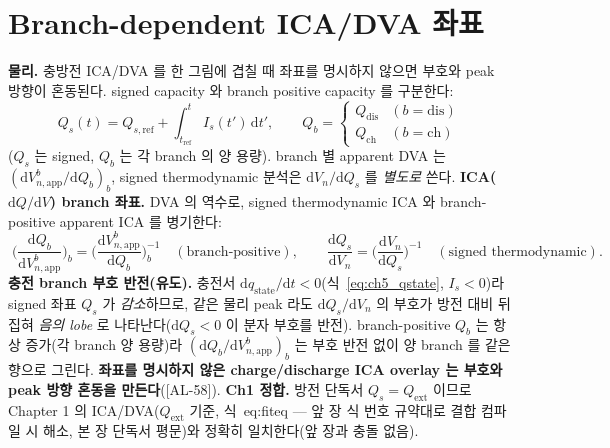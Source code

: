 \documentclass[11pt,a4paper]{article}
\newcommand{\dd}{\mathrm{d}}
\newcommand{\app}{\mathrm{app}}
\newcommand{\ext}{\mathrm{ext}}
\newcommand{\dis}{\mathrm{dis}}
\newcommand{\chg}{\mathrm{ch}}
\newcommand{\stt}{\mathrm{state}}
\newcommand{\AL}[1]{\textsf{[AL-#1]}}
\begin{document}
\section{Branch-dependent ICA/DVA 좌표}\label{sec:ch5_icadva}
\textbf{물리.} 충방전 ICA/DVA 를 한 그림에 겹칠 때 좌표를 명시하지 않으면 부호와 peak 방향이 혼동된다. signed
capacity 와 branch positive capacity 를 구분한다:
\begin{equation}
Q_s(t)=Q_{s,\mathrm{ref}}+\int_{t_{\mathrm{ref}}}^t I_s(t')\,\dd t',\qquad
Q_b=\begin{cases}Q_\dis & (b=\dis)\\ Q_\chg & (b=\chg)\end{cases}
\label{eq:ch5_signed_cap}
\end{equation}
($Q_s$ 는 signed, $Q_b$ 는 각 branch 의 양 용량). branch 별 apparent DVA 는 $(\dd V_{n,\app}^b/\dd Q_b)_b$,
signed thermodynamic 분석은 $\dd V_n/\dd Q_s$ 를 \emph{별도로} 쓴다. \textbf{ICA($\dd Q/\dd V$) branch 좌표.}
DVA 의 역수로, signed thermodynamic ICA 와 branch-positive apparent ICA 를 병기한다:
\begin{equation}
\boxed{\;\Big(\frac{\dd Q_b}{\dd V_{n,\app}^b}\Big)_b=\Big(\frac{\dd V_{n,\app}^b}{\dd Q_b}\Big)_b^{-1}
\quad(\text{branch-positive}),\qquad
\frac{\dd Q_s}{\dd V_n}=\Big(\frac{\dd V_n}{\dd Q_s}\Big)^{-1}\quad(\text{signed thermodynamic}).\;}
\label{eq:ch5_branch_ica}
\end{equation}
\textbf{충전 branch 부호 반전(유도).} 충전서 $\dd q_\stt/\dd t<0$(식~\eqref{eq:ch5_qstate}, $I_s<0$)라 signed
좌표 $Q_s$ 가 \emph{감소}하므로, 같은 물리 peak 라도 $\dd Q_s/\dd V_n$ 의 부호가 방전 대비 뒤집혀 \emph{음의
lobe} 로 나타난다($\dd Q_s<0$ 이 분자 부호를 반전). branch-positive $Q_b$ 는 항상 증가(각 branch 양 용량)라
$(\dd Q_b/\dd V_{n,\app}^b)_b$ 는 부호 반전 없이 양 branch 를 같은 향으로 그린다. \textbf{좌표를 명시하지 않은
charge/discharge ICA overlay 는 부호와 peak 방향 혼동을 만든다}(\AL{58}). \textbf{Ch1 정합.} 방전 단독서
$Q_s=Q_\ext$ 이므로 Chapter 1 의 ICA/DVA($Q_\ext$ 기준, 식~eq:fiteq — 앞 장 식 번호 규약대로 결합 컴파일 시
해소, 본 장 단독서 평문)와 정확히 일치한다(앞 장과 충돌 없음).

\end{document}
